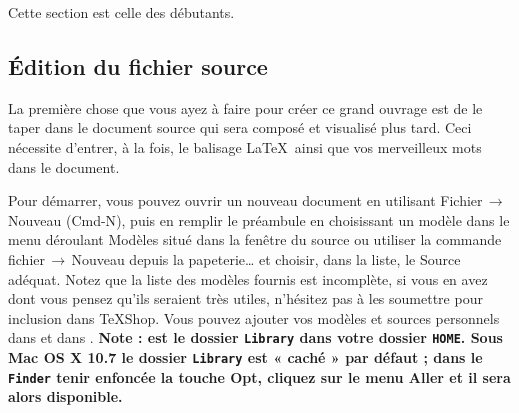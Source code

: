 \documentclass[11pt,french]{article}
\newcommand{\TS}{\textsf{\TeX Shop}}
\newcommand{\cmd}[1]{\textsf{#1}}
\newcommand{\mnu}[1]{\textsf{#1}}
\newcommand{\To}{\,\(\to\)\,}
\begin{document}

Cette section est celle des débutants.


\subsection{Édition du fichier source}

La première chose que vous ayez à faire pour créer ce grand ouvrage est de le taper dans le document source qui sera composé et visualisé plus tard. Ceci nécessite d'entrer, à la fois, le balisage \LaTeX\ ainsi que vos merveilleux mots dans le document.


Pour démarrer, vous pouvez ouvrir un nouveau document en utilisant \mnu{Fichier}\To\mnu{Nouveau} (\cmd{Cmd-N}), puis en remplir le préambule en choisissant un modèle dans le menu déroulant \mnu{Modèles} situé dans la fenêtre du source ou utiliser la commande \mnu{fichier}\To\mnu{Nouveau depuis la papeterie…} et choisir, dans la liste, le \mnu{Source} adéquat. Notez que la liste des modèles fournis est incomplète, si vous en avez dont vous pensez qu'ils seraient très utiles, n'hésitez pas à les soumettre pour inclusion dans \TS. Vous pouvez ajouter vos modèles et sources personnels dans  et dans . \textbf {Note :  est le dossier \texttt{Library} dans votre dossier \texttt{HOME}. Sous \textsf{Mac OS X 10.7} le dossier \texttt{Library} est « caché » par défaut ; dans le \texttt{Finder} tenir enfoncée la touche \cmd{Opt}, cliquez sur le menu \mnu{Aller} et il sera alors disponible.}

\end{document}
